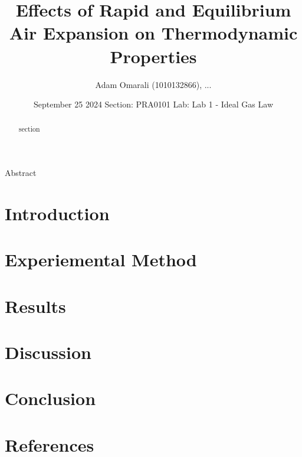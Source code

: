 \documentclass[12pt,twocolumn]{article}
\begin{document}
\title{\bf{Effects of Rapid and Equilibrium Air Expansion on Thermodynamic Properties}}
\author{Adam Omarali (1010132866), ...}
\date{September 25 2024 \linebreak 
Section: PRA0101 \linebreak
Lab: Lab 1 - Ideal Gas Law}
\maketitle

\begin{abstract}
    section
\end{abstract}{Abstract}

\section{Introduction}

\section{Experiemental Method}

\section{Results}

\section{Discussion}

\section{Conclusion}

\section{References}
\end{document}
